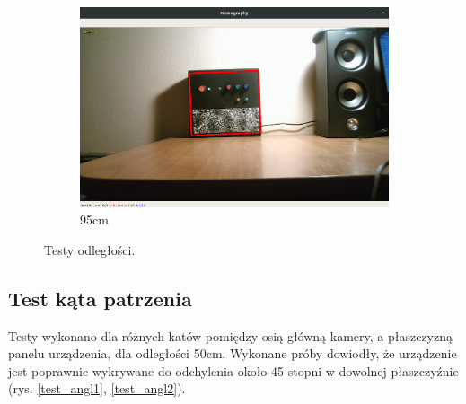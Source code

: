 \documentclass[12pt,twoside,polish]{article}
\begin{document}
\begin{figure}[htb!]
\begin{subfigure}[b]{0.5\textwidth}
		\includegraphics[width=\textwidth]{test_close3}
		\caption{95cm}
		\label{test_close3}
	\end{subfigure}
	\caption{Testy odległości.}
\end{figure}
\FloatBarrier


\subsection{Test kąta patrzenia}
Testy wykonano dla różnych katów pomiędzy osią główną kamery, a płaszczyzną panelu urządzenia, dla odległości 50cm. Wykonane próby dowiodły, że urządzenie jest poprawnie wykrywane do odchylenia około 45 stopni w dowolnej płaszczyźnie (rys. \ref{test_angl1}, \ref{test_angl2}).
\end{document}
